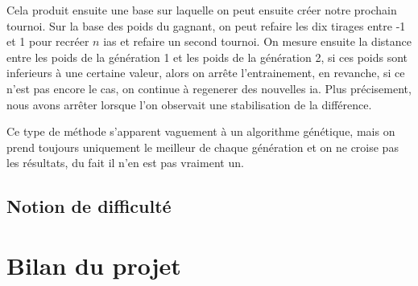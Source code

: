 \documentclass[a4paper,11pt]{article}
\begin{document}
\begin{multicols}{2}[]
    Cela produit ensuite une base sur laquelle on peut ensuite créer notre
    prochain tournoi. Sur la base des poids du gagnant, on peut refaire les dix
    tirages entre -1 et 1 pour recréer $n$ ias et refaire un second tournoi. On
    mesure ensuite la distance entre les poids de la génération 1 et les poids
    de la génération 2, si ces poids sont inferieurs à une certaine valeur,
    alors on arrête l'entrainement, en revanche, si ce n'est pas encore le cas,
    on continue à regenerer des nouvelles ia. Plus précisement, nous avons
    arrêter lorsque l'on observait une stabilisation de la différence.

    Ce type de méthode s'apparent vaguement à un algorithme génétique, mais on
    prend toujours uniquement le meilleur de chaque génération et on ne croise
    pas les résultats, du fait il n'en est pas vraiment un.

  \subsection{Notion de difficulté}

\section{Bilan du projet}

\end{multicols}
\end{document}
